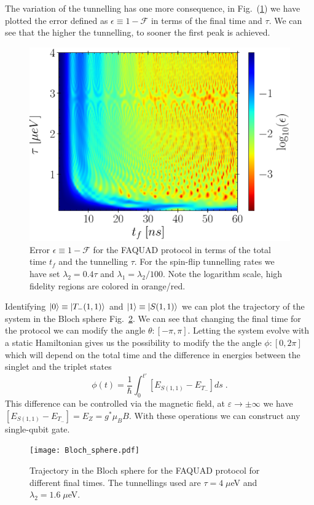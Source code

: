 \documentclass[a4paper,11pt]{article}
\begin{document}
The variation of the tunnelling has one more consequence, in Fig.~(\ref{fig:FAQUAD_DQD_Tunnelling}) we have plotted the error defined as $\epsilon\equiv 1-\mathcal{F}$ in terms of the final time and $\tau$. We can see that the higher the tunnelling, to sooner the first peak is achieved.
\begin{figure}[!htbp]
	\centering
	\includegraphics[width=0.7\linewidth]{FAQUAD_DQD_Tunnelling.eps}
	\caption{Error $\epsilon\equiv 1-\mathcal{F}$ for the FAQUAD protocol in terms of the total time $t_f$ and the tunnelling $\tau$. For the spin-flip tunnelling rates we have set $\lambda_2=0.4\tau$ and $\lambda_1=\lambda_2/100$. Note the logarithm scale, high fidelity regions are colored in orange/red.}
	\label{fig:FAQUAD_DQD_Tunnelling}
\end{figure}

Identifying $\ket{0}\equiv \ket{T_-(1,1)}$ and $\ket{1}\equiv \ket{S(1,1)}$ we can plot the trajectory of the system in the Bloch sphere Fig.~\ref{fig:Bloch_sphere}. We can see that changing the final time for the protocol we can modify the angle $\theta:[-\pi,\pi]$. Letting the system evolve with a static Hamiltonian gives us the possibility to modify the the angle $\phi:[0,2\pi]$ which will depend on the total time and the difference in energies between the singlet and the triplet states
\begin{equation}
	\phi(t)=\frac{1}{\hbar}\int_0^{t'}[E_{S(1,1)}-E_{T_-}]ds\; .
\end{equation}
This difference can be controlled via the magnetic field, at $\varepsilon\rightarrow\pm\infty$ we have $[E_{S(1,1)}-E_{T_-}]=E_Z=g^*\mu_B B$. With these operations we can construct any single-qubit gate.
\begin{figure}[!htbp]
	\centering
	\texttt{[image: Bloch\_sphere.pdf]}
	\caption{Trajectory in the Bloch sphere for the FAQUAD protocol for different final times. The tunnellings used are $\tau=4\; \mu$eV and $\lambda_2=1.6\; \mu$eV.}
	\label{fig:Bloch_sphere}
\end{figure}
\end{document}
